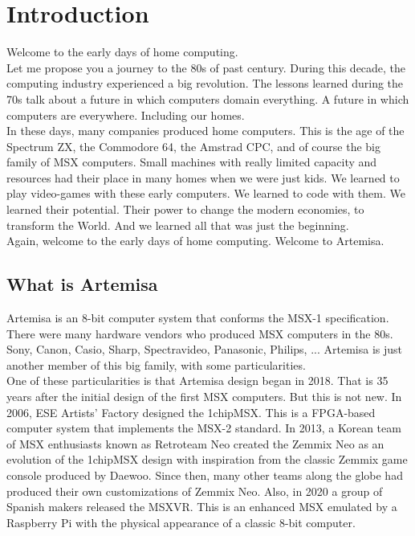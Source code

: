 \chapter{Introduction}

Welcome to the early days of home computing.\\

Let me propose you a journey to the 80s of past century. During this decade, the computing industry experienced a big revolution. The lessons learned during the 70s talk about a future in which computers domain everything. A future in which computers are everywhere. Including our homes.\\

In these days, many companies produced home computers. This is the age of the Spectrum ZX, the Commodore 64, the Amstrad CPC, and of course the big family of MSX computers. Small machines with really limited capacity and resources had their place in many homes when we were just kids. We learned to play video-games with these early computers. We learned to code with them. We learned their potential. Their power to change the modern economies, to transform the World. And we learned all that was just the beginning.\\

Again, welcome to the early days of home computing. Welcome to Artemisa.

\section{What is Artemisa}

Artemisa is an 8-bit computer system that conforms the MSX-1 specification. There were many hardware vendors who produced MSX computers in the 80s. Sony, Canon, Casio, Sharp, Spectravideo, Panasonic, Philips, ... Artemisa is just another member of this big family, with some particularities.\\

One of these particularities is that Artemisa design began in 2018. That is 35 years after the initial design of the first MSX computers. But this is not new. In 2006, ESE Artists’ Factory designed the 1chipMSX. This is a FPGA-based computer system that implements the MSX-2 standard. In 2013, a Korean team of MSX enthusiasts known as Retroteam Neo created the Zemmix Neo as an evolution of the 1chipMSX design with inspiration from the classic Zemmix game console produced by Daewoo. Since then, many other teams along the globe had produced their own customizations of Zemmix Neo. Also, in 2020 a group of Spanish makers released the MSXVR. This is an enhanced MSX emulated by a Raspberry Pi with the physical appearance of a classic 8-bit computer. \\

